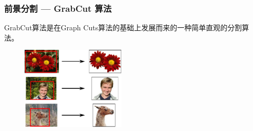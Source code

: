 \documentclass[xcolor=svgnames,serif,table]{beamer}
\begin{document}
\begin{frame}
  \frametitle{前景分割 --- GrabCut 算法}
  GrabCut算法\cite{Rother2004}是在Graph Cuts算法\cite{Boykov2001}的基础上发展而来的一种简单直观的分割算法。
  \begin{figure}
    \centering
    \includegraphics[width=5cm]{grabcut.pdf}
  \end{figure}
\end{frame}
\end{document}

